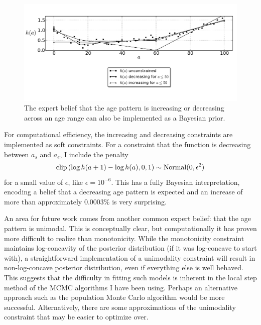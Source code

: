 \begin{figure}[h]
\begin{center}
\includegraphics[width=\textwidth]{monotone-smoothing-splines.pdf}
\caption[An informative prior that the age pattern is increasing or
  decreasing across an age range.]{The expert belief that the age
  pattern is increasing or
  decreasing across an age range can also be implemented as a Bayesian
  prior.  }
\label{monotone-age-pattern}
\end{center}
\end{figure}


For computational efficiency, the increasing and decreasing
constraints are implemented as soft constraints.  For a constraint
that the function is decreasing between $a_s$ and $a_e$, I include the penalty
\[
\operatorname{clip}\left(\log h(a+1) - \log h(a), 0, 1\right) \sim \operatorname{Normal}(0, \epsilon^2)
\]
for a small value of $\epsilon$, like $\epsilon = 10^{-6}$.  This has
a fully Bayesian interpretation, encoding a belief that a decreasing age pattern is expected
and an increase of more than approximately $0.0003$\% is very surprising.


An area for future work comes from another common expert belief: that
the age pattern is unimodal.  This is conceptually clear, but
computationally it has proven more difficult to realize than
monotonicity.  While the monotonicity constraint maintains
log-concavity of the posterior distribution (if it was log-concave to
start with), a straightforward implementation of a unimodality
constraint will result in non-log-concave posterior distribution, even
if everything else is well behaved.  This suggests that the difficulty
in fitting such models is inherent in the local step method of the
MCMC algorithms I have been using.  Perhaps an alternative approach
such as the population Monte Carlo algorithm would be more successful.
Alternatively, there are some approximations of the unimodality
constraint that may be easier to optimize over.\cite{papp_shape_2012}

